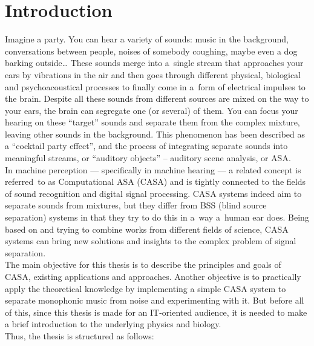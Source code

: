 \chapter{Introduction}

Imagine a party. You can hear a variety of sounds: music in the background, conversations between people, noises of somebody coughing, maybe even a dog barking outside\dots{} These sounds merge into a~single stream that approaches your ears by vibrations in the air and then goes through different physical, biological and psychoacoustical processes to finally come in a~form of electrical impulses to the brain. Despite all these sounds from different sources are mixed on the way to your ears, the brain can segregate one (or several) of them. You can focus your hearing on these “target” sounds and separate them from the complex mixture, leaving other sounds in the background. This phenomenon has been described as a “cocktail party effect”, and the process of integrating separate sounds into meaningful streams, or “auditory objects” -- auditory scene analysis, or ASA.\\

In machine perception --- specifically in machine hearing --- a related concept is referred~to as Computational ASA (CASA) and is tightly connected to the fields of sound recognition and digital signal processing. CASA systems indeed aim to separate sounds from mixtures, but they differ from BSS (blind source separation) systems in that they try to do this in a~way a~human ear does. Being based on and trying to combine works from different fields of science, CASA systems can bring new solutions and insights to the complex problem of signal separation.\\

The main objective for this thesis is to describe the principles and goals of CASA, existing applications and approaches. Another objective is to practically apply the theoretical knowledge by implementing a simple CASA system to separate monophonic music from noise and experimenting with it. But before all of this, since this thesis is made for an IT-oriented audience, it is needed to make a brief introduction to the underlying physics and biology.\\

Thus, the thesis is structured as follows:

